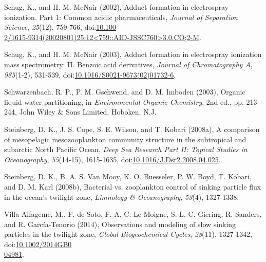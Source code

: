 \begin{singlespace}
{{Schug, K., and H. M. McNair (2002), Adduct formation in electrospray ionization. Part 1: Common acidic pharmaceuticals, \emph{Journal of Separation Science}, \emph{25}(12), 759-766, doi:\href{http://dx.doi.org/10.1002/1615-9314(20020801)25:12<759::AID-JSSC760>3.0.CO;2-M}{10.100\\2/1615-9314(20020801)25:12<759::AID-JSSC760>3.0.CO;2-M}.

Schug, K., and H. M. McNair (2003), Adduct formation in electrospray ionization mass spectrometry: II. Benzoic acid derivatives, \emph{Journal of Chromatography A}, \emph{985}(1-2), 531-539, doi:\href{http://dx.doi.org/10.1016/S0021-9673(02)01732-6}{10.1016/S0021-9673(02)01732-6}.

Schwarzenbach, R. P., P. M. Gschwend, and D. M. Imboden (2003), Organic liquid-water partitioning, in \emph{Environmental Organic Chemistry}, 2nd ed., pp. 213-244, John Wiley \& Sons Limited, Hoboken, N.J.

Steinberg, D. K., J. S. Cope, S. E. Wilson, and T. Kobari (2008a), A comparison of mesopelagic mesozooplankton community structure in the subtropical and subarctic North Pacific Ocean, \emph{Deep Sea Research Part II: Topical Studies in Oceanography}, \emph{55}(14-15), 1615-1635, doi:\href{http://dx.doi.org/10.1016/J.Dsr2.2008.04.025}{10.1016/J.Dsr2.2008.04.025}.

Steinberg, D. K., B. A. S. Van Mooy, K. O. Buesseler, P. W. Boyd, T. Kobari, and D. M. Karl (2008b), Bacterial vs. zooplankton control of sinking particle flux in the ocean's twilight zone, \emph{Limnology \& Oceanography}, \emph{53}(4), 1327-1338.

Villa-Alfageme, M., F. de Soto, F. A. C. Le Moigne, S. L. C. Giering, R. Sanders, and R. Garc\'{i}a-Tenorio (2014), Observations and modeling of slow sinking particles in the twilight zone, \emph{Global Biogeochemical Cycles}, \emph{28}(11), 1327-1342, doi:\href{http://dx.doi.org/10.1002/2014GB004981}{10.1002/2014GB0\\04981}.}}
\end{singlespace}

\clearpage

